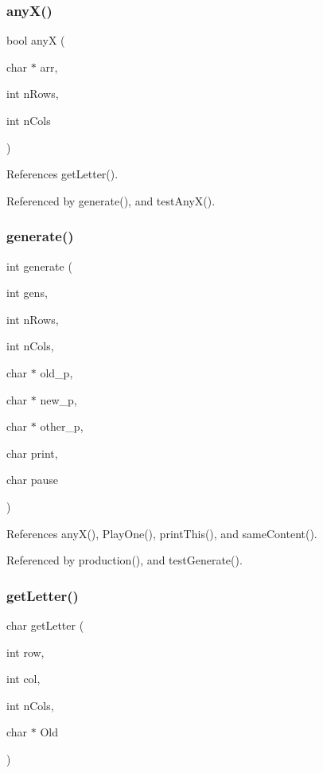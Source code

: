 \subsubsection{any\+X()}
{\footnotesize\ttfamily bool anyX (\begin{DoxyParamCaption}\item[{char $\ast$}]{arr,  }\item[{int}]{n\+Rows,  }\item[{int}]{n\+Cols }\end{DoxyParamCaption})}



References get\+Letter().



Referenced by generate(), and test\+Any\+X().

\mbox{\label{production_8c_a7986ca2f4339fb9c9d88ac88dff0f34d}} 
\subsubsection{generate()}
{\footnotesize\ttfamily int generate (\begin{DoxyParamCaption}\item[{int}]{gens,  }\item[{int}]{n\+Rows,  }\item[{int}]{n\+Cols,  }\item[{char $\ast$}]{old\+\_\+p,  }\item[{char $\ast$}]{new\+\_\+p,  }\item[{char $\ast$}]{other\+\_\+p,  }\item[{char}]{print,  }\item[{char}]{pause }\end{DoxyParamCaption})}



References any\+X(), Play\+One(), print\+This(), and same\+Content().



Referenced by production(), and test\+Generate().

\mbox{\label{production_8c_adc602acdc7ecd4199ad2b30ac03feb52}} 
\subsubsection{get\+Letter()}
{\footnotesize\ttfamily char get\+Letter (\begin{DoxyParamCaption}\item[{int}]{row,  }\item[{int}]{col,  }\item[{int}]{n\+Cols,  }\item[{char $\ast$}]{Old }\end{DoxyParamCaption})}



